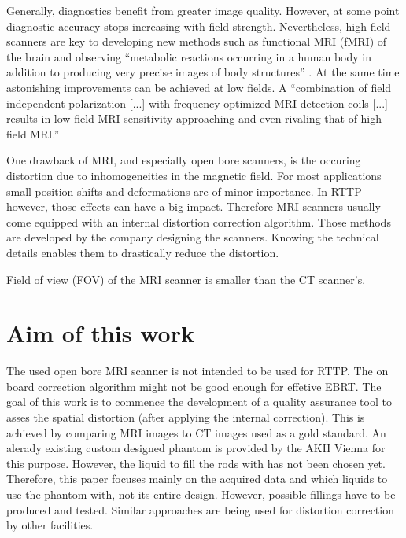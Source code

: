 Generally, diagnostics benefit from greater image quality. However, at some point diagnostic accuracy stops increasing with field strength.
Nevertheless, high field scanners are key to developing new methods such as functional MRI (fMRI) of the brain \cite{Duyn2012} and observing
``metabolic reactions occurring in a human body in addition to producing very precise images of body structures'' \cite{Wada2010}.
At the same time astonishing improvements can be achieved at low fields.
A ``combination of field independent polarization [...] with frequency optimized MRI detection coils [...] results in low-field MRI sensitivity approaching and even rivaling that of high-field MRI.'' \cite{Coffey2013}

One drawback of MRI, and especially open bore scanners, is the occuring distortion due to inhomogeneities in the magnetic field.
For most applications small position shifts and deformations are of minor importance. In RTTP however, those effects can have a big impact.
Therefore MRI scanners usually come equipped with an internal distortion correction algorithm.
Those methods are developed by the company designing the scanners. Knowing the technical details enables them to drastically reduce the distortion.

Field of view (FOV) of the MRI scanner is smaller than the CT scanner's.

\section{Aim of this work}
The used open bore MRI scanner is not intended to be used for RTTP. The on board correction algorithm might not be good enough for effetive EBRT.
The goal of this work is to commence the development of a quality assurance tool to asses the spatial distortion (after applying the internal correction).
This is achieved by comparing MRI images to CT images used as a gold standard.
An alerady existing custom designed phantom is provided by the AKH Vienna for this purpose.
However, the liquid to fill the rods with has not been chosen yet.
Therefore, this paper focuses mainly on the acquired data and which liquids to use the phantom with, not its entire design.
However, possible fillings have to be produced and tested.
Similar approaches are being used for distortion correction by other facilities. \cite{Price2015, Petersch2004, Torfeh2015, Wang2004, Wang2004b, Mizowaki2000}




\newpage